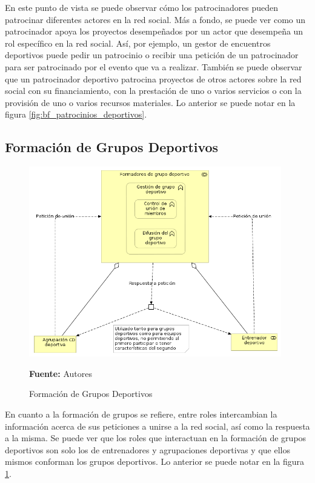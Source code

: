 En este punto de vista se puede observar cómo los patrocinadores pueden patrocinar diferentes actores en la red social. Más a fondo, se puede ver como un patrocinador apoya los proyectos desempeñados por un actor que desempeña un rol específico en la red social. Así, por ejemplo, un gestor de encuentros deportivos puede pedir un patrocinio o recibir una petición de un patrocinador para ser patrocinado por el evento que va a realizar. También se puede observar que un patrocinador deportivo patrocina proyectos de otros actores sobre la red social con su financiamiento, con la prestación de uno o varios servicios o con la provisión de uno o varios recursos materiales. Lo anterior se puede notar en la figura \ref{fig:bf_patrocinios_deportivos}.

\subsection{Formación de Grupos Deportivos}

\begin{figure}[!htb]
  \begin{center}
    \includegraphics[width=11cm]{./imagenes/Archimate/vistas/business_functions/formaciongruposdeportivos.png}
    \caption{Formación de Grupos Deportivos}
    \label{fig:bf_formacion_grupos_deportivos}
    \textbf{Fuente:}  Autores \\
  \end{center}
\end{figure}

En cuanto a la formación de grupos se refiere, entre roles intercambian la información acerca de sus peticiones a unirse a la red social, así como la respuesta a la misma. Se puede ver que los roles que interactuan en la formación de grupos deportivos son solo los de entrenadores y agrupaciones deportivas y que ellos mismos conforman los grupos deportivos. Lo anterior se puede notar en la figura \ref{fig:bf_formacion_grupos_deportivos}.

